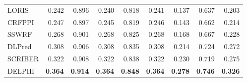 \documentclass{bioinfo}
\begin{document}
\begin{table}[H]
\begin{tabular}{@{}l@{\ }*{8}{r}}
    LORIS & 0.242 & 0.896 & 0.240 & 0.818 & 0.241 & 0.137 & 0.637 & 0.203 \\
    CRFPPI & 0.247 & 0.897 & 0.245 & 0.819 & 0.246 & 0.143 & 0.662 & 0.214 \\
    SSWRF & 0.268 & 0.901 & 0.268 & 0.825 & 0.268 & 0.168 & 0.667 & 0.228 \\
    DLPred & 0.308 & 0.906 & 0.308 & 0.835 & 0.308 & 0.214 & 0.724 & 0.272 \\
    SCRIBER & 0.322 & 0.908 & 0.322 & 0.838 & 0.322 & 0.230 & 0.719 & 0.275 \\
    DELPHI & \textbf{0.364} & \textbf{0.914} & \textbf{0.364} & \textbf{0.848} & \textbf{0.364} & \textbf{0.278} & \textbf{0.746} & \textbf{0.326} \\
    \hline
    \end{tabular}%
  \label{tab_comp_448_355}%
\end{table}%
\end{document}
